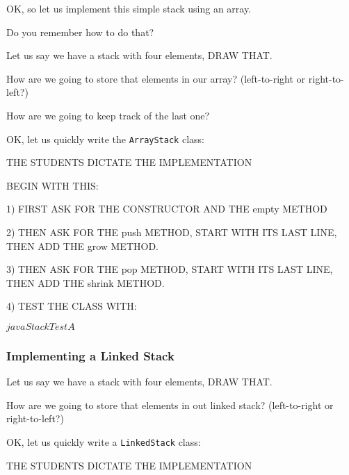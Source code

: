 \documentclass[a4paper, 9pt]{extarticle}
\newcommand{\separator}{\begin{center}%
\noindent\makebox[\linewidth]{\rule{0.75\paperwidth}{0.4pt}}%
\end{center}}
\begin{document}
OK, so let us implement this simple stack using an array.

Do you remember how to do that?

Let us say we have a stack with four elements, DRAW THAT.

How are we going to store that elements in our array? (left-to-right or
right-to-left?)

How are we going to keep track of the last one?

OK, let us quickly write the \texttt{ArrayStack} class:

THE STUDENTS DICTATE THE IMPLEMENTATION

\begin{multicols}{2}
\end{multicols}

\separator

\begin{multicols}{2}

BEGIN WITH THIS:


1) FIRST ASK FOR THE CONSTRUCTOR AND THE empty METHOD

2) THEN ASK FOR THE push METHOD, START WITH ITS LAST LINE, THEN ADD THE grow METHOD.

3) THEN ASK FOR THE pop METHOD, START WITH ITS LAST LINE, THEN ADD THE shrink METHOD.

4) TEST THE CLASS WITH:

\begin{blackboard}
$ java StackTest A
$
\end{blackboard}
\end{multicols}





\subsubsection{Implementing a Linked Stack}

Let us say we have a stack with four elements, DRAW THAT.

How are we going to store that elements in out linked stack? (left-to-right or
right-to-left?)

OK, let us quickly write a \texttt{LinkedStack} class:

THE STUDENTS DICTATE THE IMPLEMENTATION

\begin{multicols}{2}
\end{multicols}
\end{document}
